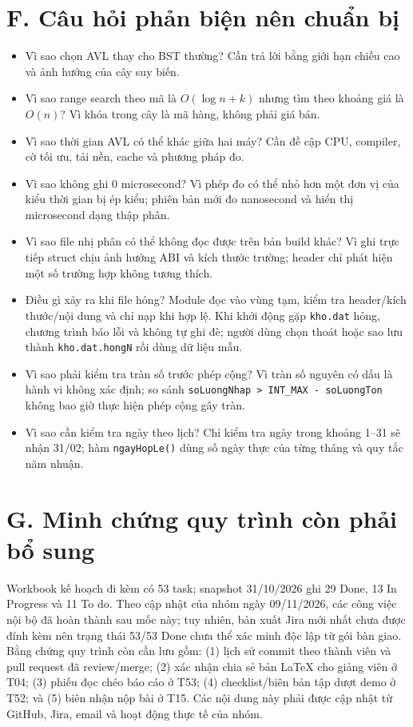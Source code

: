 \section*{F. Câu hỏi phản biện nên chuẩn bị}
\begin{itemize}
  \item Vì sao chọn AVL thay cho BST thường? Cần trả lời bằng giới hạn chiều cao và ảnh hưởng của cây suy biến.
  \item Vì sao range search theo mã là $O(\log n+k)$ nhưng tìm theo khoảng giá là $O(n)$? Vì khóa trong cây là mã hàng, không phải giá bán.
  \item Vì sao thời gian AVL có thể khác giữa hai máy? Cần đề cập CPU, compiler, cờ tối ưu, tải nền, cache và phương pháp đo.
  \item Vì sao không ghi 0 microsecond? Vì phép đo có thể nhỏ hơn một đơn vị của kiểu thời gian bị ép kiểu; phiên bản mới đo nanosecond và hiển thị microsecond dạng thập phân.
  \item Vì sao file nhị phân có thể không đọc được trên bản build khác? Vì ghi trực tiếp struct chịu ảnh hưởng ABI và kích thước trường; header chỉ phát hiện một số trường hợp không tương thích.
  \item Điều gì xảy ra khi file hỏng? Module đọc vào vùng tạm, kiểm tra header/kích thước/nội dung và chỉ nạp khi hợp lệ. Khi khởi động gặp \texttt{kho.dat} hỏng, chương trình báo lỗi và không tự ghi đè; người dùng chọn thoát hoặc sao lưu thành \texttt{kho.dat.hongN} rồi dùng dữ liệu mẫu.
  \item Vì sao phải kiểm tra tràn số trước phép cộng? Vì tràn số nguyên có dấu là hành vi không xác định; so sánh \texttt{soLuongNhap > INT\_MAX - soLuongTon} không bao giờ thực hiện phép cộng gây tràn.
  \item Vì sao cần kiểm tra ngày theo lịch? Chỉ kiểm tra ngày trong khoảng 1--31 sẽ nhận 31/02; hàm \texttt{ngayHopLe()} dùng số ngày thực của từng tháng và quy tắc năm nhuận.
\end{itemize}

\section*{G. Minh chứng quy trình còn phải bổ sung}
Workbook kế hoạch đi kèm có 53 task; snapshot 31/10/2026 ghi 29 Done, 13 In Progress và 11 To do. Theo cập nhật của nhóm ngày 09/11/2026, các công việc nội bộ đã hoàn thành sau mốc này; tuy nhiên, bản xuất Jira mới nhất chưa được đính kèm nên trạng thái 53/53 Done chưa thể xác minh độc lập từ gói bàn giao. Bằng chứng quy trình còn cần lưu gồm: (1) lịch sử commit theo thành viên và pull request đã review/merge; (2) xác nhận chia sẻ bản LaTeX cho giảng viên ở T04; (3) phiếu đọc chéo báo cáo ở T53; (4) checklist/biên bản tập dượt demo ở T52; và (5) biên nhận nộp bài ở T15. Các nội dung này phải được cập nhật từ GitHub, Jira, email và hoạt động thực tế của nhóm.


